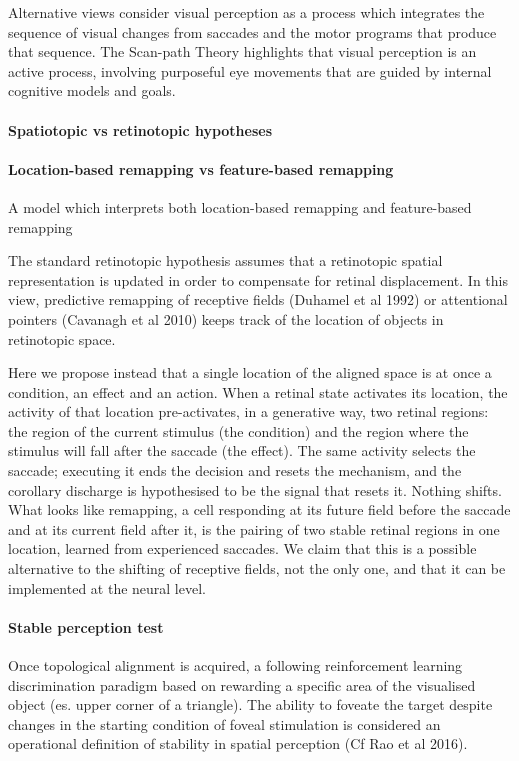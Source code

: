 \documentclass[14pt]{article}
\begin{document}
Alternative views consider visual perception as a process which integrates the sequence of visual changes from saccades and the motor programs that produce that sequence.
The Scan-path Theory highlights that visual perception is an active process, involving purposeful eye movements that are guided by internal cognitive models and goals.

\paragraph{Spatiotopic vs retinotopic hypotheses}


\paragraph{Location-based remapping vs feature-based remapping}
\citep{herwigWhenCirclesBecome2015}
A model which interprets both location-based remapping and feature-based remapping

The standard retinotopic hypothesis assumes that a retinotopic spatial representation is updated in order to compensate for retinal displacement.
In this view, predictive remapping of receptive fields (Duhamel et al 1992) or attentional pointers (Cavanagh et al 2010) keeps track of the location of objects in retinotopic space.
 

Here we propose instead that a single location of the aligned space is at once a condition, an effect and an action.
When a retinal state activates its location, the activity of that location pre-activates, in a generative way, two retinal regions: the region of the current stimulus (the condition) and the region where the stimulus will fall after the saccade (the effect).
The same activity selects the saccade; executing it ends the decision and resets the mechanism, and the corollary discharge is hypothesised to be the signal that resets it.
Nothing shifts. What looks like remapping, a cell responding at its future field before the saccade and at its current field after it, is the pairing of two stable retinal regions in one location, learned from experienced saccades.
We claim that this is a possible alternative to the shifting of receptive fields, not the only one, and that it can be implemented at the neural level.


\paragraph{Stable perception test} Once topological alignment is acquired, a following reinforcement learning discrimination paradigm based on rewarding a specific area of the visualised object (es.
upper corner of a triangle).
The ability to foveate the target despite changes in the starting condition of foveal stimulation is considered an operational definition of stability in spatial perception (Cf Rao et al 2016).
\end{document}
